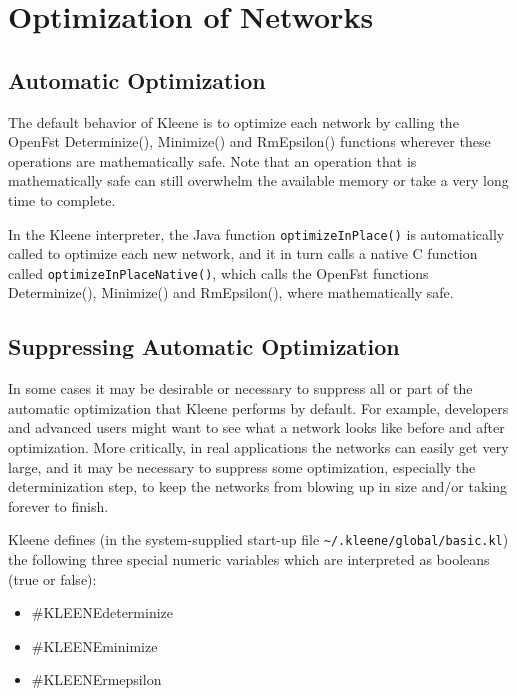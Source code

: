 \documentclass[letterpaper,12pt]{article}
\def\CPP{{C\nolinebreak[4]\hspace{-.08em}\raisebox{.3ex}{\footnotesize\bf
+}\nolinebreak\hspace{-.1em}\raisebox{.3ex}{\footnotesize\bf +}}}
\begin{document}
\newpage
\section{Optimization of Networks}

\label{app:optimize}

\subsection{Automatic Optimization}

The default behavior of Kleene is to optimize each network by calling
the OpenFst Determinize(), Minimize() and RmEpsilon() functions wherever
these operations are mathematically safe.  Note that an operation that is
mathematically safe can still overwhelm the available memory or
take a very long time to complete.

In the Kleene interpreter, the Java function \texttt{optimizeInPlace()}
is automatically called to optimize each new network, and it in turn
calls a native \CPP{} function called \texttt{optimizeInPlaceNative()},
which calls the OpenFst functions 
Determinize(), Minimize() and RmEpsilon(), where
mathematically safe.

\subsection{Suppressing Automatic Optimization}

In some cases it may be desirable or necessary to suppress all or part of
the automatic optimization that Kleene performs by default.  For example,
developers and advanced users might want to see what a network looks like
before and after optimization.  More critically, in real applications the
networks can easily get very large, and it may be necessary to suppress
some optimization, especially the determinization step, to keep the
networks from blowing up in size and/or taking forever to finish.

Kleene defines (in the system-supplied 
start-up file \verb!~/.kleene/global/basic.kl!) the following three
special numeric variables which are interpreted as booleans (true or
false):

\begin{itemize}
\item
\#KLEENEdeterminize
\item
\#KLEENEminimize
\item
\#KLEENErmepsilon
\end{itemize}
\end{document}
